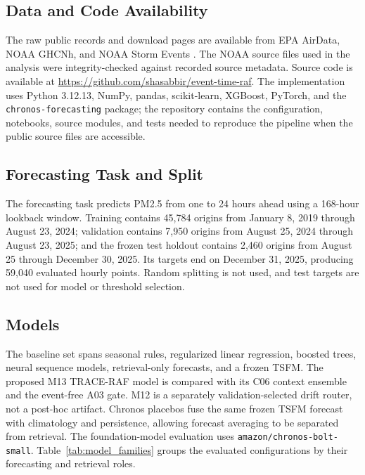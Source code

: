 \documentclass{ieeeaccess}
\begin{document}
\subsection{Data and Code Availability}
The raw public records and download pages are available from EPA AirData, NOAA
GHCNh, and NOAA Storm Events
\cite{epaairdata2026,noaaisd2026,noaastormevents2026}.
The NOAA source files used in the analysis were integrity-checked against
recorded source metadata. Source code is available at
\url{https://github.com/shasabbir/event-time-raf}. The
implementation uses Python 3.12.13, NumPy, pandas, scikit-learn, XGBoost,
PyTorch, and the \texttt{chronos-forecasting} package; the repository contains
the configuration, notebooks, source modules, and tests needed to reproduce the
pipeline when the public source files are accessible.

\subsection{Forecasting Task and Split}
The forecasting task predicts PM2.5 from one to 24 hours ahead using a 168-hour
lookback window. Training contains 45,784 origins from January 8, 2019 through
August 23, 2024; validation contains 7,950 origins from August 25, 2024 through
August 23, 2025; and the frozen test holdout contains 2,460 origins from August
25 through December 30, 2025. Its targets end on December 31, 2025, producing
59,040 evaluated hourly points. Random splitting is not used, and test targets
are not used for model or threshold selection.

\subsection{Models}
The baseline set spans seasonal rules, regularized linear regression, boosted
trees, neural sequence models, retrieval-only forecasts, and a frozen TSFM.
The proposed M13 TRACE-RAF model is compared with its C06 context ensemble and
the event-free A03 gate. M12 is a separately validation-selected drift router,
not a post-hoc artifact. Chronos placebos fuse the same frozen TSFM forecast
with climatology and persistence, allowing forecast averaging to be separated
from retrieval. The foundation-model evaluation uses
\texttt{amazon/chronos-bolt-small}.
Table~\ref{tab:model_families} groups the evaluated configurations by their
forecasting and retrieval roles.
\end{document}
